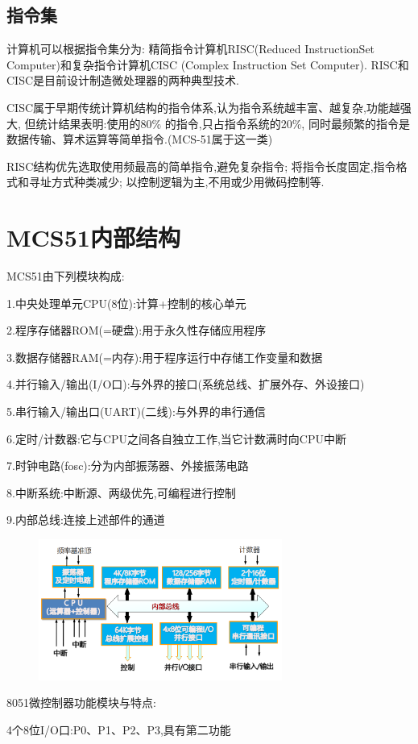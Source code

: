 \documentclass[12pt,a4paper,oneside]{ctexart}
\begin{document}
\subsection{指令集}
计算机可以根据指令集分为:
精简指令计算机RISC(Reduced InstructionSet Computer)和复杂指令计算机CISC (Complex Instruction Set Computer).
RISC和CISC是目前设计制造微处理器的两种典型技术.

CISC属于早期传统计算机结构的指令体系,认为指令系统越丰富、越复杂,功能越强大,
但统计结果表明:使用的80\% 的指令,只占指令系统的20\%,
同时最频繁的指令是数据传输、算术运算等简单指令.(MCS-51属于这一类)

RISC结构优先选取使用频最高的简单指令,避免复杂指令;
将指令长度固定,指令格式和寻址方式种类减少;
以控制逻辑为主,不用或少用微码控制等.

\section{MCS51内部结构}
MCS51由下列模块构成:

1.中央处理单元CPU(8位):计算+控制的核心单元

2.程序存储器ROM(=硬盘):用于永久性存储应用程序

3.数据存储器RAM(=内存):用于程序运行中存储工作变量和数据

4.并行输入/输出(I/O口):与外界的接口(系统总线、扩展外存、外设接口)

5.串行输入/输出口(UART)(二线):与外界的串行通信

6.定时/计数器:它与CPU之间各自独立工作,当它计数满时向CPU中断

7.时钟电路(fosc):分为内部振荡器、外接振荡电路

8.中断系统:中断源、两级优先,可编程进行控制

9.内部总线:连接上述部件的通道
\begin{figure}[H]
    \centering
    \includegraphics[width=8cm]{photos/MCS51结构.png}
\end{figure}

8051微控制器功能模块与特点:

4个8位I/O口:P0、P1、P2、P3,具有第二功能
\end{document}
